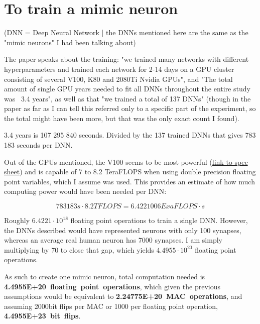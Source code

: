 \documentclass[a4paper]{article}
\begin{document}
	\pagebreak
	
	\section{To train a mimic neuron}
	
	(DNN = Deep Neural Network | the DNNs mentioned here are the same as the "mimic neurons" I had been talking about)
	
	\medskip
	
	The paper speaks about the training: "we trained many networks with different hyperparameters and trained each network for 2-14 days on a GPU cluster consisting of several V100, K80 and 2080Ti Nvidia GPUs", and "The total amount of single GPU years needed	to fit all DNNs throughout the entire study was ~3.4 years", as well as that "we trained a total of 137 DNNs" (though in the paper as far as I can tell this referred only to a specific part of the experiment, so the total might have been more, but that was the only exact count I found).
	
	\medskip
	
	3.4 years is 107 295 840 seconds. Divided by the 137 trained DNNs that gives 783 183 seconds per DNN.
	
	\medskip
	
	Out of the GPUs mentioned, the V100 seems to be most powerful (\href{https://images.nvidia.com/content/technologies/volta/pdf/volta-v100-datasheet-update-us-1165301-r5.pdf}{link to spec sheet}) and is capable of 7 to 8.2 TeraFLOPS when using double precision floating point variables, which I assume was used. This provides an estimate of how much computing power would have been needed per DNN:
	
	$$ 783 183s \cdot 8.2TFLOPS = 6.4221006 ExaFLOPS\cdot s $$
	
	Roughly $6.4221\cdot10^{18}$ floating point operations to train a single DNN. However, the DNNs described would have represented neurons with only 100 synapses, whereas an average real human neuron has 7000 synapses. I am simply multiplying by 70 to close that gap, which yields $4.4955 \cdot 10^{20}$ floating point operations.
	
	\bigskip
	
	As such to create one mimic neuron, total computation needed is \textbf{4.4955E+20~floating~point~operations}, which given the previous assumptions would be equivalent to \textbf{2.24775E+20~MAC~operations}, and assuming 2000bit flips per MAC or 1000 per floating point operation, \textbf{4.4955E+23~bit~flips}.
	
\end{document}
